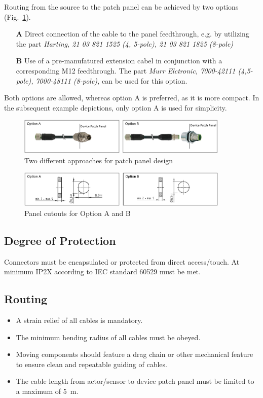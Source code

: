Routing from the source to the patch panel can be achieved by two options (Fig.~\ref{fig:PatchingOptions}).
\begin{itemize}
    \item[\bf A] Direct connection of the cable to the panel feedthrough, e.g. by utilizing the part \emph{Harting, 21 03 821 1525 (4, 5-pole), 21 03 821 1825 (8-pole)}
    \item[\bf B] Use of a pre-manufatured extension cabel in conjunction with a corresponding M12 feedthrough. The part \emph{Murr Elctronic, 7000-42111 (4,5-pole), 7000-48111 (8-pole), } can be used for this option.
\end{itemize}
Both options are allowed, whereas option A is preferred, as it is more compact.
In the subsequent example depictions, only option A is used for simplicity.

\begin{figure}[H]
\centering
\includegraphics[width=0.9\textwidth]{Figures/PatchingOptions.jpg}
\caption{\label{fig:PatchingOptions}Two different approaches for patch panel design}
\end{figure}


\begin{figure}[H]
\centering
\includegraphics[width=0.9\textwidth]{Figures/PanelCutOut.jpg}
\caption{\label{fig:PanelCutOut}Panel cutouts for Option A and B}
\end{figure}

\subsection{Degree of Protection}
Connectors must be encapsulated or protected from direct access/touch. At minimum IP2X according to IEC standard 60529 must be met.

\subsection{Routing}
\begin{itemize}
    \item A strain relief of all cables is mandatory.
    \item The minimum bending radius of all cables must be obeyed.
    \item Moving components should feature a drag chain or other mechanical feature to ensure clean and repeatable guiding of cables.
    \item The cable length from actor/sensor to device patch panel must be limited to a maximum of 5~m.
\end{itemize}

